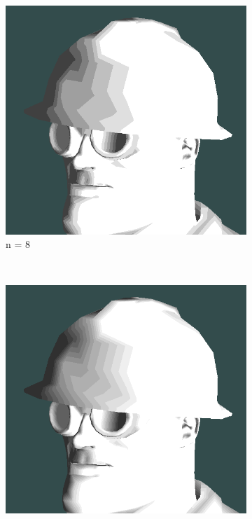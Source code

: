 \begin{figure}[h]
    \begin{subfigure}[b]{0.15\textwidth}
        \includegraphics[width=\textwidth]{img/cel-shading-n8.png}
        \caption{n = 8}
        \label{fig:cel-shading-n8}
    \end{subfigure}
    ~
    \begin{subfigure}[b]{0.15\textwidth}
        \includegraphics[width=\textwidth]{img/cel-shading-n16.png}

\end{subfigure}
\end{figure}
